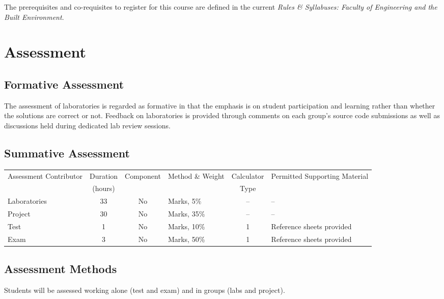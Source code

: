 \documentclass[11pt]{eie-cbo}
\begin{document}
The prerequisites and co-requisites to register for this course are defined in the current \emph{Rules \& Syllabuses: Faculty of Engineering and the Built Environment}.

\section{Assessment}\label{assessment}

\subsection{Formative Assessment}\label{formative}
The assessment of laboratories is regarded as formative in that the emphasis is on student participation and learning rather than whether the solutions are correct or not. Feedback on laboratories is provided through comments on each group's source code submissions as well as discussions held during dedicated lab review sessions.

\pagebreak
\subsection{Summative Assessment}\label{summative}
\begin{table}[ht]\small\centering
\begin{tabular}{lcclcl}\toprule
\multirow{2}{2cm}{Assessment Contributor}  & Duration & Component & \multirow{2}{1.5cm}{Method \& Weight} & Calculator & \multirow{2}{3.5cm}{Permitted Supporting Material}\\ 
 & (hours) & & & Type &  \\
\midrule
Laboratories & 33  & No & Marks, 5\% & -- & --  \\
Project & 30  & No & Marks, 35\% & -- & --  \\
Test & 1  & No & Marks, 10\% & 1 & Reference sheets provided  \\
Exam & 3  & No & Marks, 50\% & 1 & Reference sheets provided  \\
\bottomrule
\end{tabular}\label{tab:sum-contributors}
\end{table}

\subsection{Assessment Methods}\label{methods}

Students will be assessed working alone (test and exam) and in groups (labs and project). 
\end{document}
